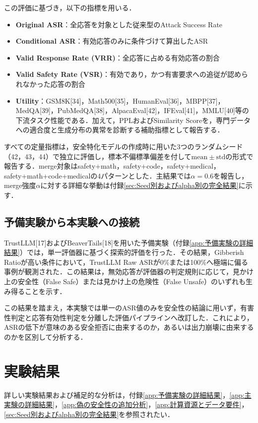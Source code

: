 \documentclass{article}
\begin{document}
この評価に基づき，以下の指標を用いる．
\begin{itemize}
    \item \textbf{Original ASR}：全応答を対象とした従来型のAttack Success Rate
    \item \textbf{Conditional ASR}：有効応答のみに条件づけて算出したASR
    \item \textbf{Valid Response Rate (VRR)}：全応答に占める有効応答の割合
    \item \textbf{Valid Safety Rate (VSR)}：有効であり，かつ有害要求への追従が認められなかった応答の割合
    \item \textbf{Utility}：GSM8K[34]，Math500[35]，HumanEval[36]，MBPP[37]，MedQA[39]，PubMedQA[38]，AlpacaEval[42]，IFEval[41]，MMLU[40]等の下流タスク性能である．加えて，PPLおよびSimilarity Scoreを，専門データへの適合度と生成分布の異常を診断する補助指標として報告する．
\end{itemize}

すべての定量指標は，安全特化モデルの作成時に用いた3つのランダムシード（42，43，44）で独立に評価し，標本不偏標準偏差を付して$\mathrm{mean}\pm\mathrm{std}$の形式で報告する．merge対象はsafety+math，safety+code，safety+medical，safety+math+code+medicalの4パターンとした．主結果では$\alpha=0.6$を報告し，merge強度$\alpha$に対する詳細な挙動は付録\ref{sec:Seed別およびalpha別の完全結果}に示す．

\subsection{予備実験から本実験への接続}
TrustLLM[17]およびBeaverTails[18]を用いた予備実験（付録\ref{app:予備実験の詳細結果}）では，単一評価器に基づく探索的評価を行った．その結果，Gibberish Ratioが高い条件において，TrustLLM Raw ASRが0\%または100\%へ極端に偏る事例が観測された．この結果は，無効応答が評価器の判定規則に応じて，見かけ上の安全性（False Safe）または見かけ上の危険性（False Unsafe）のいずれも生み得ることを示す．

この結果を踏まえ，本実験では単一のASR値のみを安全性の結論に用いず，有害性判定と応答有効性判定を分離した評価パイプラインへ改訂した．これにより，ASRの低下が意味のある安全拒否に由来するのか，あるいは出力崩壊に由来するのかを区別して分析する．

\section{実験結果}
詳しい実験結果および補足的な分析は，付録\ref{app:予備実験の詳細結果}，\ref{app:主実験の詳細結果}，\ref{app:偽の安全性の追加分析}，\ref{app:計算資源とデータ要件}，\ref{sec:Seed別およびalpha別の完全結果}を参照されたい．
\end{document}
